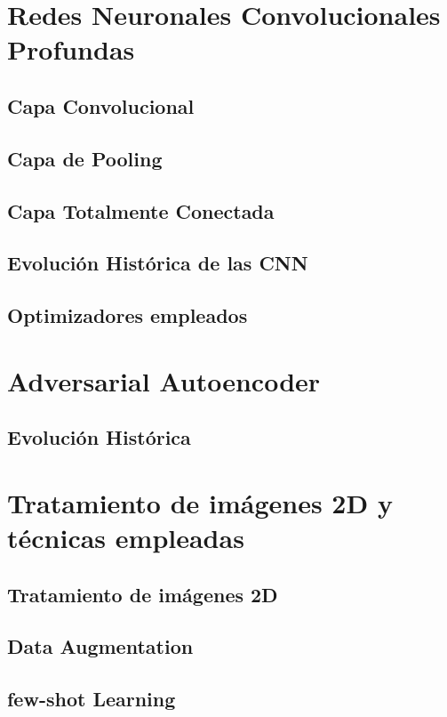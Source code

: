 \section{Redes Neuronales Convolucionales Profundas}
    \subsection{Capa Convolucional}

    \subsection{Capa de Pooling}

    \subsection{Capa Totalmente Conectada}

    \subsection{Evolución Histórica de las CNN}

    \subsection{Optimizadores empleados}

\section{Adversarial Autoencoder}
    \subsection{Evolución Histórica}

\section{Tratamiento de imágenes 2D y técnicas empleadas}
    \subsection{Tratamiento de imágenes 2D}

    \subsection{Data Augmentation}

    \subsection{few-shot Learning}

\endinput

